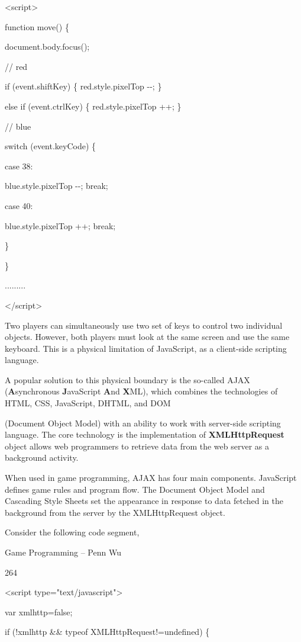 \documentclass[
]{article}
\begin{document}
\textless script\textgreater{}

function move() \{

document.body.focus();

// red

if (event.shiftKey) \{ red.style.pixelTop -\/-; \}

else if (event.ctrlKey) \{ red.style.pixelTop ++; \}

// blue

switch (event.keyCode) \{

case 38:

blue.style.pixelTop -\/-; break;

case 40:

blue.style.pixelTop ++; break;

\}

\}

.........

\textless/script\textgreater{}

Two players can simultaneously use two set of keys to control two
individual objects. However, both players must look at the same screen
and use the same keyboard. This is a physical limitation of JavaScript,
as a client-side scripting language.

A popular solution to this physical boundary is the so-called AJAX
(\textbf{A}synchronous \textbf{J}avaScript \textbf{A}nd \textbf{X}ML),
which combines the technologies of HTML, CSS, JavaScript, DHTML, and DOM

(Document Object Model) with an ability to work with server-side
scripting language. The core technology is the implementation of
\textbf{XMLHttpRequest} object allows web programmers to retrieve data
from the web server as a background activity.

When used in game programming, AJAX has four main components. JavaScript
defines game rules and program flow. The Document Object Model and
Cascading Style Sheets set the appearance in response to data fetched in
the background from the server by the XMLHttpRequest object.

Consider the following code segment,

Game Programming -- Penn Wu

264

\protect\hypertarget{index_split_014.htmlux5cux23p265}{}{}

\textless script type="text/javascript"\textgreater{}

var xmlhttp=false;

if (!xmlhttp \&\& typeof
XMLHttpRequest!=\textquotesingle undefined\textquotesingle) \{
\end{document}
